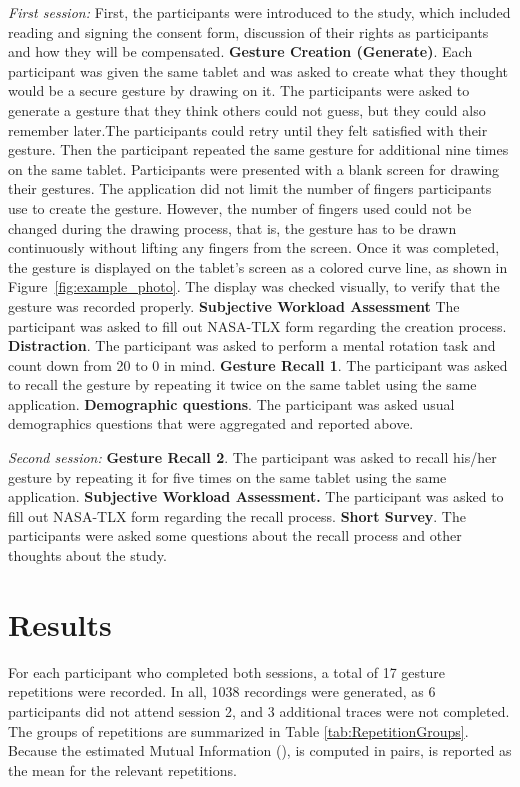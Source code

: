 \documentclass{sig-alternate-10pt}
\begin{document}
\textit{First session:} First, the participants were introduced to the study, which included reading and signing the consent form, discussion of their rights as participants and how they will be compensated. \textbf{Gesture Creation (Generate)}. Each participant was given the same tablet and was asked to create what they thought would be a secure gesture by drawing on it. The participants were asked to generate a gesture that they think others could not guess, but they could also remember later.The participants could retry until they felt satisfied with their gesture. Then the participant repeated the same gesture for additional nine times on the same tablet. Participants were presented with a blank screen for drawing their gestures. The application did not limit the number of fingers participants use to create the gesture. However, the number of fingers used could not be changed during the drawing process, that is, the gesture has to be drawn continuously without lifting any fingers from the screen.
Once it was completed, the gesture is displayed on the tablet's screen as a colored curve line, as shown in Figure~\ref{fig:example_photo}. The display was checked visually, to verify that the gesture was recorded properly. \textbf{Subjective Workload Assessment} The participant was asked to fill out NASA-TLX form regarding the creation process. \textbf{Distraction}. The participant was asked to perform a mental rotation task and count down from 20 to 0 in mind.
\textbf{Gesture Recall 1}. The participant was asked to recall the gesture by repeating it twice on the same tablet using the same application.
 \textbf{Demographic questions}. The participant was asked usual demographics questions that were aggregated and reported above.


\textit{Second session:}  \textbf{Gesture Recall 2}. The participant was asked to recall his/her gesture by repeating it for five times on the same tablet using the same application.  \textbf{Subjective Workload Assessment.} The participant was asked to fill out NASA-TLX form regarding the recall process. \textbf{Short Survey}. The participants were asked some questions about the recall process and other thoughts about the study.

\newpage

\section{Results}


For each participant who completed both sessions, a total of 17 gesture repetitions were recorded. In all, 1038 recordings were generated, as 6 participants did not attend session 2, and 3 additional traces were not completed. The groups of repetitions are summarized in Table \ref{tab:RepetitionGroups}. Because the estimated Mutual Information (), is computed in pairs,  is reported as the mean for the relevant repetitions.
\end{document}
